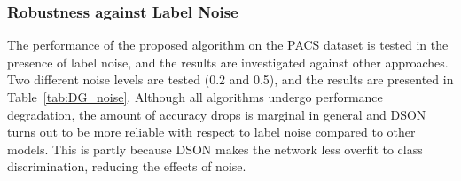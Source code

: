 \documentclass[runningheads]{llncs}
\begin{document}
\subsubsection{Robustness against Label Noise}
The performance of the proposed algorithm on the PACS dataset is tested in the presence of label noise, and the results are investigated against other approaches.
Two different noise levels are tested (0.2 and 0.5), and the results are presented in Table~\ref{tab:DG_noise}.
Although all algorithms undergo performance degradation, the amount of accuracy drops is marginal in general and DSON turns out to be more reliable with respect to label noise compared to other models.
This is partly because DSON makes the network less overfit to class discrimination, reducing the effects of noise.



\begin{table}[t]
	\begin{center}
	\caption{Multi-source domain adaptation results on the PACS dataset using \cite{shu2019transferable} as a backbone with a ResNet-18 architecture.}
	\label{tab:multi-source_DA}
	\end{center}

\end{table}
\end{document}
